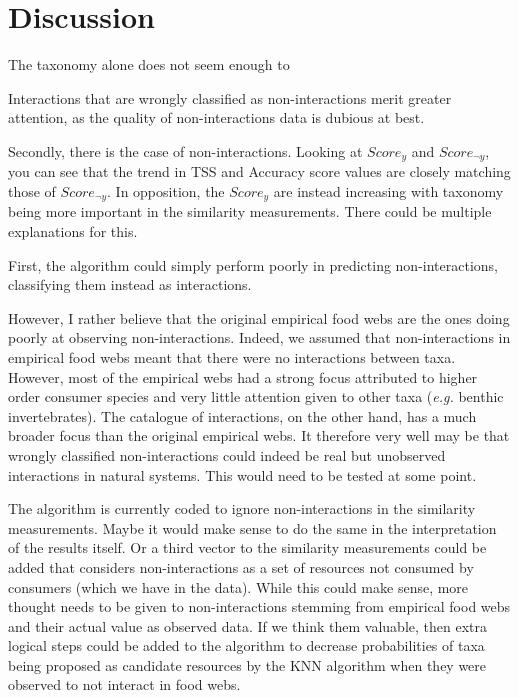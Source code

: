 \documentclass[letterpaper]{article}
\begin{document}
\section{Discussion}

The taxonomy alone does not seem enough to


Interactions that are wrongly classified as non-interactions merit greater attention, as the quality of non-interactions data is dubious at best.

Secondly, there is the case of non-interactions. Looking at $Score_y$ and $Score_{\neg y}$, you can see that the trend in TSS and Accuracy score values are closely matching those of $Score_{\neg y}$. In opposition, the $Score_y$ are instead increasing with taxonomy being more important in the similarity measurements. There could be multiple explanations for this.

First, the algorithm could simply perform poorly in predicting non-interactions, classifying them instead as interactions.

However, I rather believe that the original empirical food webs are the ones doing poorly at observing non-interactions. Indeed, we assumed that non-interactions in empirical food webs meant that there were no interactions between taxa. However, most of the empirical webs had a strong focus attributed to higher order consumer species and very little attention given to other taxa (\textit{e.g.} benthic invertebrates). The catalogue of interactions, on the other hand, has a much broader focus than the original empirical webs. It therefore very well may be that wrongly classified non-interactions could indeed be real but unobserved interactions in natural systems. This would need to be tested at some point.

The algorithm is currently coded to ignore non-interactions in the similarity measurements. Maybe it would make sense to do the same in the interpretation of the results itself. Or a third vector to the similarity measurements could be added that considers non-interactions as a set of resources not consumed by consumers (which we have in the data). While this could make sense, more thought needs to be given to non-interactions stemming from empirical food webs and their actual value as observed data. If we think them valuable, then extra logical steps could be added to the algorithm to decrease probabilities of taxa being proposed as candidate resources by the KNN algorithm when they were observed to not interact in food webs.
\end{document}
